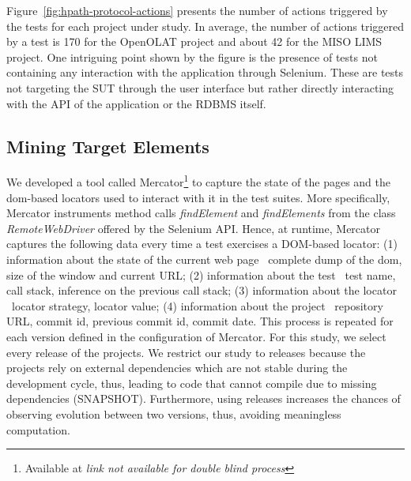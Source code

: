 Figure~\ref{fig:hpath-protocol-actions} presents the number of actions triggered by the tests for each project under study. In average, the number of actions triggered by a test is 170 for the OpenOLAT project and about 42 for the MISO LIMS project. One intriguing point shown by the figure is the presence of tests not containing any interaction with the application through Selenium. These are tests not targeting the SUT through the user interface but rather directly interacting with the API of the application or the RDBMS itself.

\subsection{Mining Target Elements}
\label{sec:hpath-protocol-elements}

We developed a tool called Mercator\footnote{Available at \textit{link not available for double blind process}} to capture the state of the pages and the \gls{dom}-based locators used to interact with it in the test suites. More specifically, Mercator instruments method calls \emph{findElement} and \emph{findElements} from the class \emph{RemoteWebDriver} offered by the Selenium API. Hence, at runtime, Mercator captures the following data every time a test exercises a DOM-based locator: (1) information about the state of the current web page \ie\ complete dump of the \gls{dom}, size of the window and current URL; (2) information about the test \ie\ test name, call stack, inference on the previous call stack; (3) information about the locator \ie\ locator strategy, locator value; (4) information about the project \ie\ repository URL, commit id, previous commit id, commit date. This process is repeated for each version defined in the configuration of Mercator. For this study, we select every release of the projects. We restrict our study to releases because the projects rely on external dependencies which are not stable during the development cycle, thus, leading to code that cannot compile due to missing dependencies (SNAPSHOT). Furthermore, using releases increases the chances of observing evolution between two versions, thus, avoiding meaningless computation.

